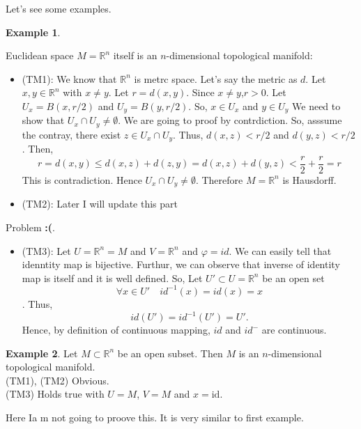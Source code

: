 \documentclass[
]{book}
\providecommand{\tightlist}{%
  \setlength{\itemsep}{0pt}\setlength{\parskip}{0pt}}
\theoremstyle{definition}
\theoremstyle{definition}
\newtheorem{example}{Example}[chapter]
\theoremstyle{definition}
\theoremstyle{definition}
\theoremstyle{remark}
\begin{document}
Let's see some examples.

\begin{example}
\protect\hypertarget{exm:unnamed-chunk-7}{}\label{exm:unnamed-chunk-7}

Euclidean space \(M=\mathbb{R}^n\) itself is an \(n\)-dimensional topological manifold:

\begin{itemize}
\tightlist
\item
  (TM1): We know that \(\mathbb{R}^n\) is metrc space. Let's say the metric as \(d\). Let \(x,y\in \mathbb{R}^n\) with \(x\neq y\).
  Let \(r=d(x,y)\). Since \(x\neq y\),\(r>0\).
  Let \(U_x=B(x,r/2)\) and \(U_y=B(y,r/2)\).
  So, \(x\in U_x\) and \(y\in U_y\) We need to show that \(U_x \cap U_y\neq \emptyset\). We are going to proof by contrdiction. So, asssume the contray, there exist \(z\in U_x\cap U_y\). Thus,
  \(d(x,z)<r/2\) and \(d(y,z)<r/2\). Then,
  \[r=d(x,y)\leq d(x,z)+d(z,y)=d(x,z)+d(y,z)<\frac{r}{2}+\frac{r}{2}=r\]
  This is contradiction. Hence \(U_x\cap U_y \neq \emptyset\). Therefore \(M=\mathbb{R}^n\) is Hausdorff.
\item
  (TM2): Later I will update this part
\end{itemize}

{Problem \textbf{:(}}.

\begin{itemize}
\tightlist
\item
  (TM3): Let \(U=\mathbb{R}^n=M\) and \(V=\mathbb{R}^n\) and \(\varphi=id\). We can easily tell that idenntity map is bijective. Furthur, we can observe that inverse of identity map is itself and it is well defined.
  So, Let \(U'\subset U=\mathbb{R}^n\) be an open set
  \[\forall x\in U'\quad id^{-1}(x)=id(x)=x\]. Thus, \[id(U')=id^{-1}(U')=U'.\] Hence, by definition of continuous mapping, \(id\) and \(id^{-}\) are continuous.
\end{itemize}

\end{example}

\begin{example}
\protect\hypertarget{exm:unnamed-chunk-8}{}\label{exm:unnamed-chunk-8}Let \(M \subset \mathbb{R}^n\) be an open subset. Then \(M\) is an \(n\)-dimensional topological manifold.\\
(TM1), (TM2) Obvious.\\
(TM3) Holds true with \(U = M\), \(V = M\) and \(x = \text{id}\).

Here Ia m not going to proove this. It is very similar to first example.
\end{example}
\end{document}
